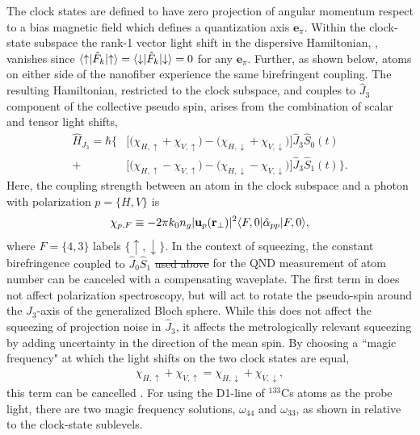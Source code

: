 \documentclass[preprint,aps,pra,onecolumn]{revtex4-1} %
\newcommand{\jz}{\hat{J}_3}
\newcommand{\comment}[1]{{\color{Maroon} #1}}
\begin{document}
The clock states are defined to have zero projection of angular momentum respect to a bias magnetic field which defines a quantization axis $\mathbf{e}_\pi$.  Within the clock-state subspace the rank-1 vector light shift in the dispersive Hamiltonian, , vanishes since $\langle{\uparrow}\rvert\hat{F}_k \lvert{\uparrow}\rangle =\langle{\downarrow}\rvert\hat{F}_k \lvert{\downarrow}\rangle = 0$ for any $\mathbf{e}_\pi$. Further, as shown below, atoms on either side of the nanofiber experience the same birefringent coupling. The resulting Hamiltonian, restricted to the clock subspace, and couples to $\hat{J}_3$ component of the collective pseudo spin, arises from the combination of scalar and tensor light shifts,
	\begin{align} \label{Eq::ClockHamiltonian}
		\hat{H}_{J_3} = \hbar \Big\{ & \big[ \big( \chi_{H,\uparrow} +\chi_{V,\uparrow} \big) - \big( \chi_{H,\downarrow} + \chi_{V,\downarrow}\big) \big] \jz \hat{S}_0(t) \\
		+ & \big[  \big( \chi_{H, \uparrow} - \chi_{V,\uparrow} \big) - \big(\chi_{H,\downarrow} - \chi_{V,\downarrow} \big) \big]  \jz \hat{S}_1(t) \Big\}. \nonumber
	\end{align}
Here, the coupling strength between an atom in the clock subspace and a photon with polarization $p = \{H,V\}$ is
	\begin{equation} \label{Eq::ClockCouplingStrength}
		\chi_{p,F} \equiv - 2\pi k_0 n_g  | \mathbf{u}_p(\mathbf{r}_\perp)|^2 \langle{F,0}\rvert\hat{\alpha}_{pp}  \lvert{F,0}\rangle,
	\end{equation}
where $F = \{4,3\}$ labels $\{\uparrow,\downarrow\}$. In the context of squeezing, the constant birefringence \comment{coupled to $ \hat{J}_0\hat{S}_1 $ \sout{used above}} for the QND measurement of atom number can be canceled with a compensating waveplate. The first term in  does not affect polarization spectroscopy, but will act to rotate the pseudo-spin around the $J_3$-axis of the generalized Bloch sphere.  While this does not affect the squeezing of projection noise in $\hat{J}_3$, it affects the metrologically relevant squeezing by adding uncertainty in the direction of the mean spin.  By choosing a ``magic frequency" at which the light shifts on the two clock states are equal, 
	\begin{align} \label{Eq::MagicWavelengthCondition}
		\chi_{H,\uparrow} +\chi_{V,\uparrow}  = \chi_{H,\downarrow} + \chi_{V,\downarrow},
	\end{align}
this term can be cancelled \cite{chaudhury_continuous_2006}. 
For using the D1-line of $^{133}$Cs atoms as the probe light, there are two magic frequency solutions, $ \omega_{44} $ and $ \omega_{33} $, as shown in  relative to the clock-state sublevels.
\end{document}

